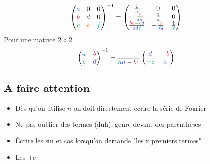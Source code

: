 \documentclass[resume]{subfiles}
\begin{document}
$$\begin{pmatrix}
\textcolor{RoyalBlue}{a} & 0 & 0\\
\textcolor{OrangeRed}{b} & \textcolor{Violet}{d} & 0\\
\textcolor{ForestGreen}{c} & \textcolor{Orange}{e} & \textcolor{ProcessBlue}{f}
\end{pmatrix}^{-1}=\begin{pmatrix}
\frac{1}{\textcolor{RoyalBlue}{a}} & 0 & 0\\
-\frac{\textcolor{OrangeRed}{b}}{\textcolor{RoyalBlue}{a}\textcolor{Violet}{d}} & \frac{1}{\textcolor{Violet}{d}} & 0\\
\frac{\textcolor{OrangeRed}{b}\textcolor{Orange}{e}-\textcolor{ForestGreen}{c}\textcolor{Violet}{d}}{\textcolor{RoyalBlue}{a}\textcolor{Violet}{d}\textcolor{ProcessBlue}{f}} & -\frac{\textcolor{Orange}{e}}{\textcolor{ProcessBlue}{f}\textcolor{Violet}{d}} &
\frac{1}{\textcolor{ProcessBlue}{f}}
\end{pmatrix}$$
Pour une matrice $2\times 2$
$$\begin{pmatrix}
\textcolor{RoyalBlue}{a} & \textcolor{OrangeRed}{b}\\
\textcolor{ForestGreen}{c} & \textcolor{Violet}{d}
\end{pmatrix}^{-1}=\frac{1}{\textcolor{RoyalBlue}{a}\textcolor{Violet}{d}-\textcolor{OrangeRed}{b}\textcolor{ForestGreen}{c}}\begin{pmatrix}
\textcolor{Violet}{d} & \textcolor{OrangeRed}{-b}\\
\textcolor{ForestGreen}{-c} & \textcolor{RoyalBlue}{a}
\end{pmatrix}$$
\subsection{A faire attention}

\begin{mdframed}[linewidth=2pt,linecolor=OrangeRed!50!White]
\begin{itemize}
\item Dès qu'on utilise $n$ on doit directement écrire la série de Fourier
\item Ne pas oublier des termes (duh), genre devant des parenthèses
\item Écrire les sin et cos lorsqu'on demande "les x premiers termes"
\item Les $+c$
\end{itemize}

\end{mdframed}
\end{document}

